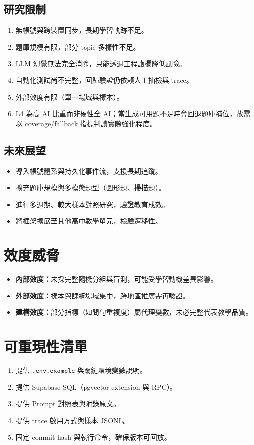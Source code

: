\documentclass[12pt,a4paper]{article}
\begin{document}
\subsection{研究限制}
\begin{enumerate}[leftmargin=2em]
  \item 無帳號與跨裝置同步，長期學習軌跡不足。
  \item 題庫規模有限，部分 topic 多樣性不足。
  \item LLM 幻覺無法完全消除，只能透過工程護欄降低風險。
  \item 自動化測試尚不完整，回歸驗證仍依賴人工抽檢與 trace。
  \item 外部效度有限（單一場域與樣本）。
  \item L4 為高 AI 比重而非硬性全 AI；當生成可用題不足時會回退題庫補位，故需以 coverage/fallback 指標判讀實際強化程度。
\end{enumerate}

\subsection{未來展望}
\begin{itemize}[leftmargin=2em]
  \item 導入帳號體系與持久化事件流，支援長期追蹤。
  \item 擴充題庫規模與多模態題型（圖形題、掃描題）。
  \item 進行多週期、較大樣本對照研究，驗證教育成效。
  \item 將框架擴展至其他高中數學單元，檢驗遷移性。
\end{itemize}

\section*{效度威脅}
\begin{itemize}[leftmargin=2em]
  \item \textbf{內部效度：}未採完整隨機分組與盲測，可能受學習動機差異影響。
  \item \textbf{外部效度：}樣本與課綱場域集中，跨地區推廣需再驗證。
  \item \textbf{建構效度：}部分指標（如問句重複度）屬代理變數，未必完整代表教學品質。
\end{itemize}

\section*{可重現性清單}
\begin{enumerate}[leftmargin=2em]
  \item 提供 \texttt{.env.example} 與關鍵環境變數說明。
  \item 提供 Supabase SQL（pgvector extension 與 RPC）。
  \item 提供 Prompt 對照表與附錄原文。
  \item 提供 trace 啟用方式與樣本 JSONL。
  \item 固定 commit hash 與執行命令，確保版本可回放。
\end{enumerate}
\end{document}
